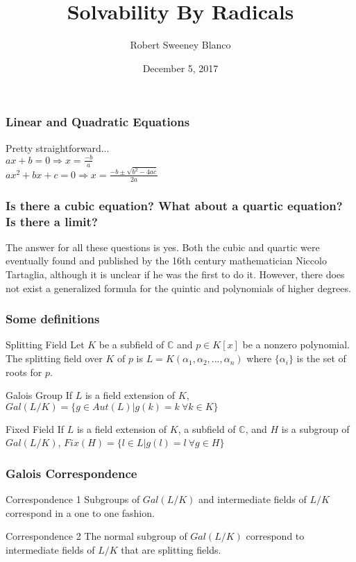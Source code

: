 \documentclass{beamer}
\title{Solvability By Radicals}
\author{Robert Sweeney Blanco}
\institute{Advisor: Brandon Williams}
\date{December 5, 2017}
\begin{document}
 
\frame{\titlepage}
 
\begin{frame}
\frametitle{Linear and Quadratic Equations}
Pretty straightforward...\\ 
\vspace{1cm}
$ax + b = 0 \Rightarrow x = \frac{-b}{a}$\\
\vspace{1cm}
$ax^2+bx+c=0 \Rightarrow x = \frac{-b \pm \sqrt{b^2-4ac}}{2a}$
\end{frame}

\begin{frame}
\frametitle{Is there a cubic equation? What about a quartic equation? Is there a limit?}
The answer for all these questions is yes. Both the cubic and quartic  were eventually found and published by the 16th century mathematician Niccolo Tartaglia, although it is unclear if he was the first to do it. However, there does not exist a generalized formula for the quintic and polynomials of higher degrees. 
\end{frame}

\begin{frame}
\frametitle{Some definitions}
\begin{block}{Splitting Field}
Let $K$ be a subfield of $\mathbb{C}$ and $p \in K[x]$ be a nonzero polynomial. The splitting field over $K$ of $p$ is $L=K(\alpha_1, \alpha_2,...,\alpha_n)$ where $\{\alpha_i\}$ is the set of roots for $p$.\\
\end{block}
\begin{block}{Galois Group}
If $L$ is a field extension of $K$, $Gal(L/K) = \{g \in Aut(L) | g(k)=k \ \forall k \in K \} $
\end{block}
\begin{block}{Fixed Field}
If $L$ is a field extension of $K$, a subfield of $\mathbb{C}$, and $H$ is a subgroup of $Gal(L/K)$, $Fix(H) = \{l \in L | g(l)=l \ \forall g \in H\}$
\end{block}
\end{frame}

\begin{frame}
\frametitle{Galois Correspondence}
\begin{block}{Correspondence 1}
Subgroups of $Gal(L/K)$ and intermediate fields of $L/K$ correspond in a one to one fashion.
\end{block}
\begin{block}{Correspondence 2}
The normal subgroup of $Gal(L/K)$ correspond to intermediate fields of $L/K$ that are splitting fields.
\end{block}
\end{frame}
\end{document}
